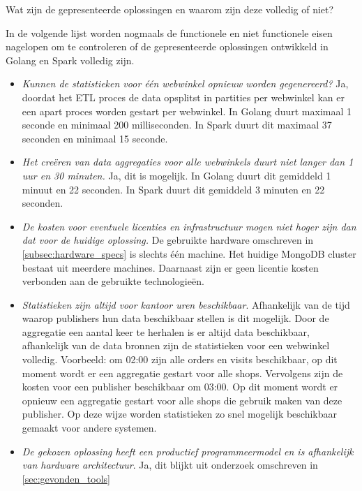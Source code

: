 Wat zijn de gepresenteerde oplossingen en waarom zijn deze volledig of niet?

In de volgende lijst worden nogmaals de functionele en niet functionele eisen nagelopen om te controleren of de gepresenteerde oplossingen ontwikkeld in Golang en Spark volledig zijn.

\begin{itemize}
    \item \textit{Kunnen de statistieken voor één webwinkel opnieuw worden gegenereerd?} Ja, doordat het ETL proces de data opsplitst in partities per webwinkel kan er een apart proces worden gestart per webwinkel. In Golang duurt maximaal 1 seconde en minimaal 200 milliseconden. In Spark duurt dit maximaal 37 seconden en minimaal 15 seconde.
    
    \item \textit{ Het creëren van data aggregaties voor alle webwinkels duurt niet langer dan 1 uur en 30 minuten.} Ja, dit is mogelijk. In Golang duurt dit gemiddeld 1 minuut en 22 seconden. In Spark duurt dit gemiddeld 3 minuten en 22 seconden.
    
    \item \textit{De kosten voor eventuele licenties en infrastructuur mogen niet hoger zijn dan dat voor de huidige oplossing.} De gebruikte hardware omschreven in \ref{subsec:hardware_specs} is slechts één machine. Het huidige MongoDB cluster bestaat uit meerdere machines. Daarnaast zijn er geen licentie kosten verbonden aan de gebruikte technologieën.
    
    \item \textit{Statistieken zijn altijd voor kantoor uren beschikbaar}. Afhankelijk van de tijd waarop publishers hun data beschikbaar stellen is dit mogelijk. Door de aggregatie een aantal keer te herhalen is er altijd data beschikbaar, afhankelijk van de data bronnen zijn de statistieken voor een webwinkel volledig. Voorbeeld: om 02:00 zijn alle orders en visits beschikbaar, op dit moment wordt er een aggregatie gestart voor alle shops. Vervolgens zijn de kosten voor een publisher beschikbaar om 03:00. Op dit moment wordt er opnieuw een aggregatie gestart voor alle shops die gebruik maken van deze publisher. Op deze wijze worden statistieken zo snel mogelijk beschikbaar gemaakt voor andere systemen.
    
    \item \textit{De gekozen oplossing heeft een productief programmeermodel en is afhankelijk van hardware architectuur}. Ja, dit blijkt uit onderzoek omschreven in  \ref{sec:gevonden_tools}
    

\end{itemize}

